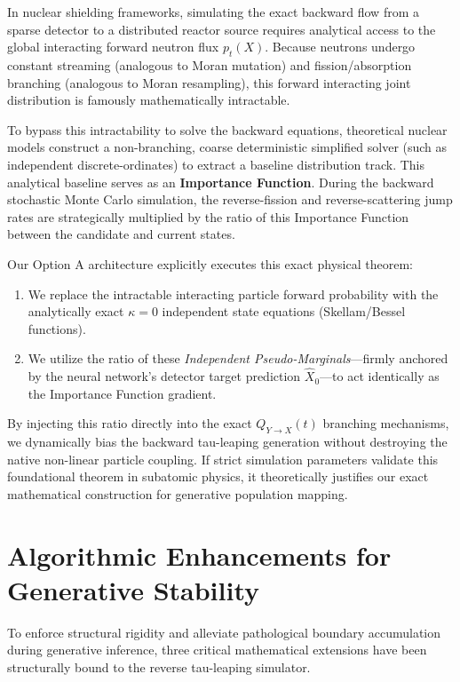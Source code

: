 \documentclass[11pt]{article}
\begin{document}
In nuclear shielding frameworks, simulating the exact backward flow from a sparse detector to a distributed reactor source requires analytical access to the global interacting forward neutron flux $p_t(X)$. Because neutrons undergo constant streaming (analogous to Moran mutation) and fission/absorption branching (analogous to Moran resampling), this forward interacting joint distribution is famously mathematically intractable.

To bypass this intractability to solve the backward equations, theoretical nuclear models construct a non-branching, coarse deterministic simplified solver (such as independent discrete-ordinates) to extract a baseline distribution track. This analytical baseline serves as an \textbf{Importance Function}. During the backward stochastic Monte Carlo simulation, the reverse-fission and reverse-scattering jump rates are strategically multiplied by the ratio of this Importance Function between the candidate and current states.

Our Option A architecture explicitly executes this exact physical theorem:
\begin{enumerate}
    \item We replace the intractable interacting particle forward probability with the analytically exact $\kappa=0$ independent state equations (Skellam/Bessel functions).
    \item We utilize the ratio of these \textit{Independent Pseudo-Marginals}---firmly anchored by the neural network's detector target prediction $\hat{X}_0$---to act identically as the Importance Function gradient.
\end{enumerate}

By injecting this ratio directly into the exact $Q_{Y \to X}(t)$ branching mechanisms, we dynamically bias the backward tau-leaping generation without destroying the native non-linear particle coupling. If strict simulation parameters validate this foundational theorem in subatomic physics, it theoretically justifies our exact mathematical construction for generative population mapping.

\section{Algorithmic Enhancements for Generative Stability}

To enforce structural rigidity and alleviate pathological boundary accumulation during generative inference, three critical mathematical extensions have been structurally bound to the reverse tau-leaping simulator.
\end{document}
